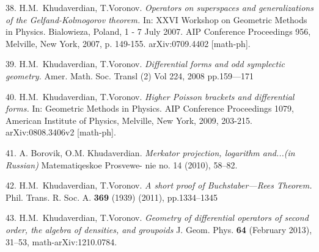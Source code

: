 \documentclass[12pt]{article}
\def\m {\medskip}
\begin{document}
38. H.M.~Khudaverdian, T.Voronov. {\it
  Operators on superspaces and generalizations of the 
Gelfand-Kolmogorov theorem.}
In: XXVI Workshop on Geometric Methods in Physics. Bialowieza, Poland, 1 - 7 July 2007.
AIP Conference Proceedings 956, Melville, New York, 2007, p. 149-155. arXiv:0709.4402 [math-ph].



\medskip


39. H.M.~Khudaverdian, T.Voronov. {\it  Differential forms and odd
symplectic geometry.}
       Amer. Math. Soc.  Transl (2) Vol 224, 2008 pp.159---171


\medskip

40. H.M.~Khudaverdian, T.Voronov. {\it Higher Poisson brackets and
differential forms.} In: Geometric Methods in Physics. AIP
Conference Proceedings 1079, American Institute of Physics,
Melville, New York, 2009, 203-215. arXiv:0808.3406v2 [math-ph].

\medskip

41. A. Borovik, O.M. Khudaverdian. {\it Merkator projection, logarithm and...(in Russian)}
  Matematiqeskoe Prosvewe- nie no. 14 (2010), 58--82.


\medskip

42. H.M.~Khudaverdian, T.Voronov. {\it  
A short proof of Buchstaber---Rees Theorem.}
       Phil. Trans. R. Soc. A. {\bf 369} (1939) (2011),
     pp.1334--1345




\m

43. H.M.~Khudaverdian, T.Voronov. {\it Geometry of differential operators
of second order, the algebra of densities, and groupoids} J. Geom. Phys.
 {\bf 64} (February 2013), 31--53, math-arXiv:1210.0784.
\end{document}
